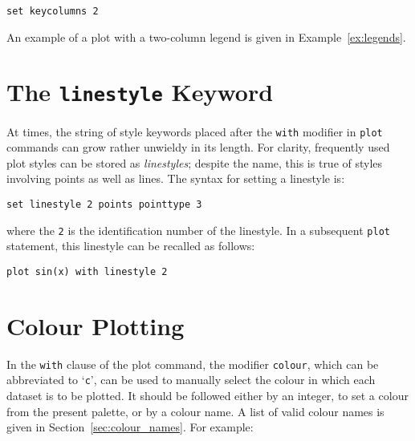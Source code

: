 \begin{verbatim}
set keycolumns 2
\end{verbatim}

\noindent An example of a plot with a two-column legend is given in
Example~\ref{ex:legends}.


\section{The {\tt linestyle} Keyword}

At times, the string of style keywords placed after the {\tt with} modifier
in {\tt plot} commands can grow rather unwieldy in its length. For clarity,
frequently used plot styles can be stored as {\it linestyles}; despite the name,
this is true of styles involving points as well as lines. The syntax for
setting a linestyle is:

\begin{verbatim}
set linestyle 2 points pointtype 3
\end{verbatim}

\noindent where the {\tt 2} is the identification number of the linestyle. In a
subsequent {\tt plot} statement, this linestyle can be recalled as follows:

\begin{verbatim}
plot sin(x) with linestyle 2
\end{verbatim}

\section{Colour Plotting}

 In the {\tt with} clause of the plot
command, the modifier {\tt colour}, which can be abbreviated to
`{\tt c}', can be used to manually select the colour in which each dataset
is to be plotted. It should be followed either by an integer, to set a colour
from the present palette, or by a colour name. A list of valid colour names is
given in Section~\ref{sec:colour_names}. For example:

